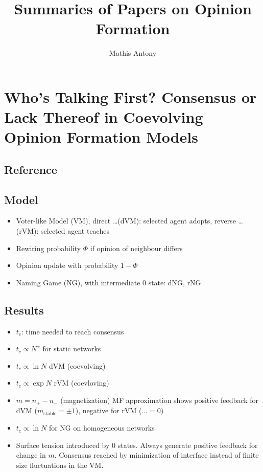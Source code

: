 \documentclass[a4paper]{scrartcl}
\begin{document}
\title{Summaries of Papers on Opinion Formation}
\author{Mathis Antony}
\maketitle
\tableofcontents
\section{Who's Talking First? Consensus or Lack Thereof in Coevolving Opinion
    Formation Models}
  \subsection{Reference}
  \subsection{Model}
    \begin{itemize}
      \item Voter-like Model (VM), direct \ldots (dVM): selected agent adopts,
        reverse \ldots (rVM): selected agent teaches
      \item Rewiring probability $\Phi$ if opinion of neighbour differs
      \item Opinion update with probability $1-\Phi$  
      \item Naming Game (NG), with intermediate 0 state: dNG, rNG
    \end{itemize}
  \subsection{Results}
    \begin{itemize}
      \item $t_c$: time needed to reach consensus
      \item $t_c \propto N^\alpha$ for static networks
      \item $t_c \propto \ln N$ dVM (coevolving)
      \item $t_c \propto \exp N$ rVM (coevloving)
      \item $m=n_+-n_-$ (magnetization) MF approximation shows positive
        feedback for dVM ($m_\textrm{stable}=\pm1$), negative for rVM
        ($\ldots=0$) 
      \item $t_c \propto \ln N$ for NG on homogeneous networks
      \item Surface tension introduced by 0 states. Always generate positive
          feedback for change in $m$. Consensus reached by minimization of
          interface instead of finite size fluctuations in the VM.
    \end{itemize}
\end{document}
